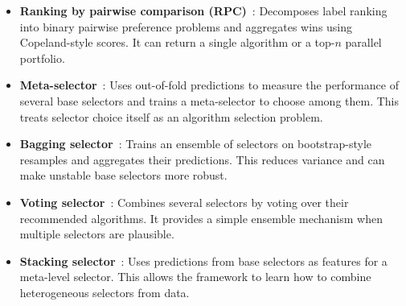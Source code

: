 \begin{itemize}
    \item \textbf{Ranking by pairwise comparison (RPC)}~\citep{HulEtAl19}: Decomposes label ranking into binary pairwise preference problems and aggregates wins using Copeland-style scores. It can return a single algorithm or a top-$n$ parallel portfolio.
    \item \textbf{Meta-selector}~\citep{TorEtAl23}: Uses out-of-fold predictions to measure the performance of several base selectors and trains a meta-selector to choose among them. This treats selector choice itself as an algorithm selection problem.
    \item \textbf{Bagging selector}~\citep{TorEtAl23}: Trains an ensemble of selectors on bootstrap-style resamples and aggregates their predictions. This reduces variance and can make unstable base selectors more robust.
    \item \textbf{Voting selector}~\citep{TorEtAl23}: Combines several selectors by voting over their recommended algorithms. It provides a simple ensemble mechanism when multiple selectors are plausible.
    \item \textbf{Stacking selector}~\citep{TorEtAl23}: Uses predictions from base selectors as features for a meta-level selector. This allows the framework to learn how to combine heterogeneous selectors from data.
\end{itemize}

